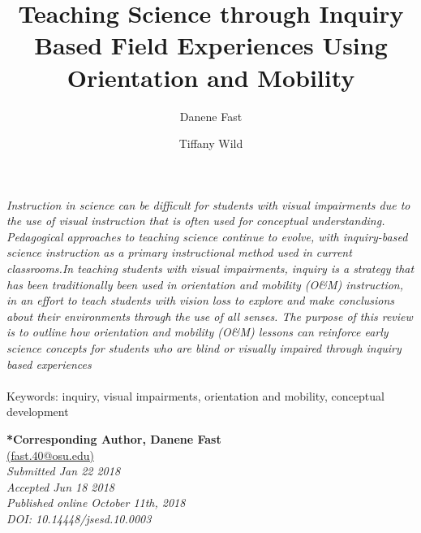 \documentclass[11.5pt]{sig-alternate} %
\makeatletter
\let\oldabstract\abstract
\let\oldendabstract\endabstract
\renewenvironment{abstract} %
{\renewenvironment{quotation}%
               {\list{}{\addtolength{\leftmargin}{1em} %
                        \listparindent 1.5em%
                        \itemindent    \listparindent%
                        \rightmargin   \leftmargin%
                        \parsep        \z@ \@plus\p@}%
                \item\relax}%
               {\endlist}%
\oldabstract}
{\oldendabstract}
\makeatother
\begin{document}
\title{Teaching Science through Inquiry Based Field Experiences
Using Orientation and Mobility}

\author[1]{\large \color{blue}Danene Fast}
\author[1]{\large \color{blue}Tiffany Wild}

\toappear{}
\maketitle
\begin{@twocolumnfalse} 
\begin{abstract}
\item 
\textit {Instruction in science can be difficult for students with visual impairments due to the use of visual instruction that is often used for conceptual understanding. Pedagogical approaches to teaching science continue to evolve, with inquiry-based science instruction as a primary instructional method used in current classrooms.In teaching students with visual impairments, inquiry is a strategy that has been traditionally been used in orientation and mobility (O\&M) instruction, in an effort to teach students with vision loss to explore and make conclusions about their environments through the use of all senses. The purpose of this review is to outline how orientation and mobility (O\&M) lessons can reinforce early science concepts for students who are blind or visually impaired through inquiry based experiences}
\\ \\
Keywords: inquiry, visual impairments, orientation and mobility, conceptual development
\end{abstract}
\end{@twocolumnfalse}


\textbf{*Corresponding Author, Danene Fast}\\
\href{mailto: fast.40@osu.edu }{(fast.40@osu.edu)} \\
\textit{Submitted  Jan 22 2018 }\\
\textit{Accepted Jun 18 2018} \\
\textit{Published online October 11th, 2018} \\
\textit{DOI: 10.14448/jsesd.10.0003} \\
\pagebreak
\clearpage
\end{document}
